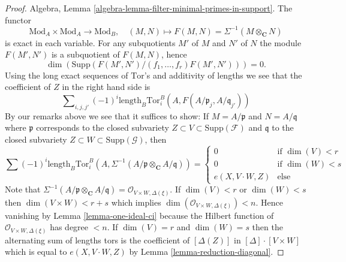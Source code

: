 \begin{proof}
Algebra, Lemma \ref{algebra-lemma-filter-minimal-primes-in-support}.
The functor
$$
\text{Mod}_A \times \text{Mod}_A \longrightarrow \text{Mod}_B,\quad
(M, N) \longmapsto F(M, N) = \Sigma^{-1}(M \otimes_\mathbf{C} N)
$$
is exact in each variable.
For any subquotients $M'$ of $M$ and $N'$ of $N$ the module
$F(M', N')$ is a subquotient of $F(M, N)$, hence
$$
\dim(\text{Supp}(F(M', N')/(f_1, \ldots, f_r)F(M', N'))) = 0.
$$
Using the long exact sequences of $\text{Tor}$'s and additivity of lengths
we see that the coefficient of $Z$ in the right hand side is
$$
\sum\nolimits_{i, j, j'}
(-1)^i
\text{length}_B \text{Tor}_i^B(A, F(A/\mathfrak p_j, A/\mathfrak q_{j'}))
$$
By our remarks above we see that it suffices to show: If $M = A/\mathfrak p$
and $N = A/\mathfrak q$ where $\mathfrak p$ corresponds to the closed
subvariety $Z \subset V \subset \text{Supp}(\mathcal{F})$ and $\mathfrak q$
to the closed subvariety $Z \subset W \subset \text{Supp}(\mathcal{G})$, then
$$
\sum (-1)^i
\text{length}_B
\text{Tor}_i^B(A,
\Sigma^{-1}(A/\mathfrak p \otimes_\mathbf{C} A/\mathfrak q))
=
\left\{
\begin{matrix}
0 & \text{if } \dim(V) < r \\
0 & \text{if } \dim(W) < s \\
e(X, V \cdot W, Z) & \text{else}
\end{matrix}
\right.
$$
Note that
$\Sigma^{-1}(A/\mathfrak p \otimes_\mathbf{C} A/\mathfrak q) =
\mathcal{O}_{V \times W, \Delta(\xi)}$.
If $\dim(V) < r$ or $\dim(W) < s$ then $\dim(V \times W) < r + s$
which implies $\dim(\mathcal{O}_{V \times W, \Delta(\xi)}) < n$.
Hence vanishing by Lemma \ref{lemma-one-ideal-ci} because
the Hilbert function of $\mathcal{O}_{V \times W, \Delta(\xi)}$
has degree $< n$. If $\dim(V) = r$ and $\dim(W) = s$
then the alternating sum of lengths tors is the coefficient of
$[\Delta(Z)]$ in $[\Delta] \cdot [V \times W]$ which is
equal to $e(X, V \cdot W, Z)$ by Lemma \ref{lemma-reduction-diagonal}.
\end{proof}

